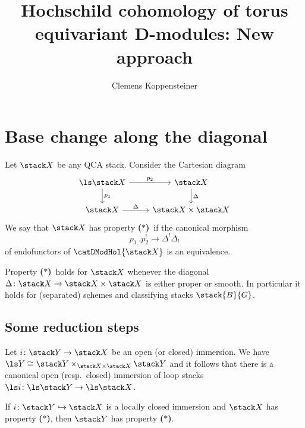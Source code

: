 \documentclass{ck-article}
\title{Hochschild cohomology of torus equivariant D-modules: New approach}
\author{Clemens Koppensteiner}
\newcommand\bc{\textbf{($\mathbf{*}$)}}
\newcommand\cs{\stack{B}}
\begin{document}
\maketitle

\section{Base change along the diagonal}

\begin{Def}
    Let $\stack X$ be any QCA stack.
    Consider the Cartesian diagram
    \[
        \begin{tikzcd}
            \ls \stack X \arrow[d, "p_1"] \arrow[r, "p_2"] & \stack X \arrow[d, "\Delta"] \\
            \stack X \arrow[r, "\Delta"] & \stack X \times \stack X
        \end{tikzcd}
    \]
    We say that $\stack X$ has property \bc\ if the canonical morphism
    \[
        p_{1,!}p_2^! \to \Delta^!\Delta_!
    \]
    of endofunctors of $\catDModHol{\stack X}$ is an equivalence.
\end{Def}

\begin{Lem}\label{lem:bc_smooth_or_proper}
    Property \bc\ holds for $\stack X$ whenever the diagonal $\Delta\colon \stack X \to \stack X \times \stack X$ is either proper or smooth.
    In particular it holds for (separated) schemes and classifying stacks $\cs{G}$.
\end{Lem}

\subsection{Some reduction steps}

Let $i\colon\stack Y \to \stack X$ be an open (or closed) immersion.
We have $\ls Y \cong \stack Y \times_{\stack X \times \stack X} \stack Y$ and it follows that there is a canonical open (resp.~closed) immersion of loop stacks $\ls i\colon \ls \stack Y \to \ls \stack X$.

\begin{Lem}\label{lem:bc_lc_immersion}
    If $i\colon\stack Y \hookrightarrow \stack X$ is a locally closed immersion and $\stack X$ has property \bc, then $\stack Y$ has property \bc.
\end{Lem}
\end{document}
